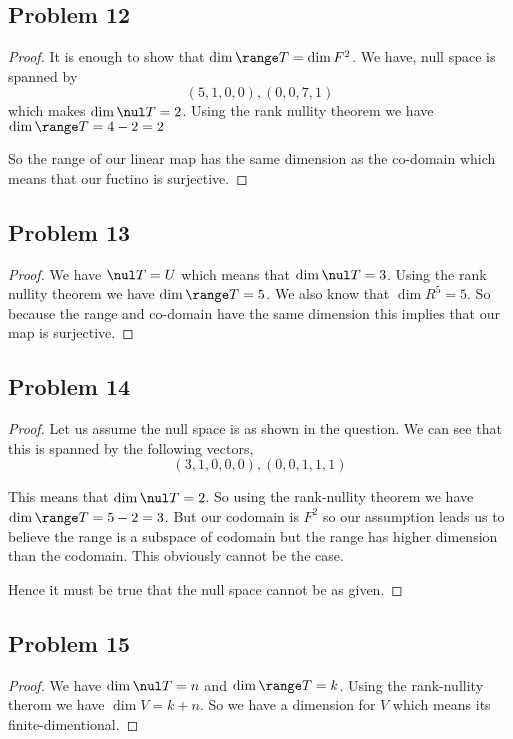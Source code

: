 \documentclass[a4paper]{report}
\begin{document}
\subsection*{Problem 12}
\begin{proof}
    It is enough to show that $\dim \range T = \dim F^{2}$. We have, null space is spanned by 
    $$ (5,1,0,0), (0,0,7,1) $$ which makes $\dim \nul T = 2$. Using the rank nullity theorem we have $\dim \range T = 4 -2 = 2 $

    So the range of our linear map has the same dimension as the co-domain which means that our fuctino is surjective.
\end{proof}

\subsection*{Problem 13}
\begin{proof}
    
We have $\nul T = U$ which means that $\dim \nul T = 3$. Using the rank nullity theorem we have $\dim \range T = 5$. We also know that $\dim R^{5} = 5$. So because the range and co-domain have the same dimension this implies that our map is surjective.

\end{proof}
\subsection*{Problem 14}
\begin{proof}
    
Let us assume the null space is as shown in the question. We can see that this is spanned by the following vectors,  
$$ (3,1,0,0,0), (0,0,1,1,1) $$ 

This means that $\dim \nul T = 2$. So using the rank-nullity theorem we have  $\dim \range T = 5 - 2 = 3$. But our codomain is  $F^{2}$ so our assumption leads us to believe the range is a subspace of codomain but the range has higher dimension than the codomain. This  obviously cannot be the case. 

Hence it must be true that the null space cannot be as given.

\end{proof}
\subsection*{Problem 15}
\begin{proof}
    
We have $\dim \nul T = n$ and $\dim \range T = k$. Using the rank-nullity therom we have  $\dim V = k + n$. So we have a dimension for $V$ which means its  finite-dimentional.
\end{proof}
\end{document}
